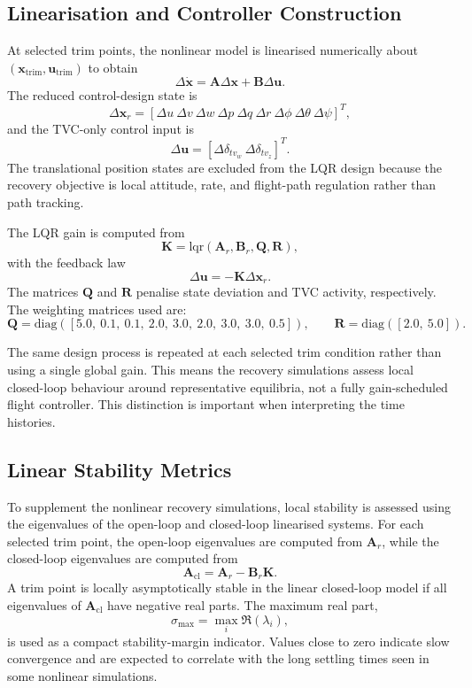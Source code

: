 \documentclass[conf]{new-aiaa}
\newcommand{\xtrim}{\mathbf{x}_{\mathrm{trim}}}
\newcommand{\utrim}{\mathbf{u}_{\mathrm{trim}}}
\newcommand{\Acl}{\mathbf{A}_{\mathrm{cl}}}
\begin{document}
\subsection{Linearisation and Controller Construction}
At selected trim points, the nonlinear model is linearised numerically about $(\xtrim,\utrim)$ to obtain
\begin{equation}
\Delta\dot{\mathbf{x}} = \mathbf{A}\Delta\mathbf{x} + \mathbf{B}\Delta\mathbf{u}.
\end{equation}
The reduced control-design state is
\[
\Delta\mathbf{x}_r = [\Delta u\ \Delta v\ \Delta w\ \Delta p\ \Delta q\ \Delta r\ \Delta\phi\ \Delta\theta\ \Delta\psi]^T,
\]
and the TVC-only control input is
\[
\Delta\mathbf{u} = [\Delta\delta_{tv_w}\ \Delta\delta_{tv_z}]^T.
\]
The translational position states are excluded from the LQR design because the recovery objective is local attitude, rate, and flight-path regulation rather than path tracking.

The LQR gain is computed from
\begin{equation}
\mathbf{K}=\mathrm{lqr}(\mathbf{A}_r,\mathbf{B}_r,\mathbf{Q},\mathbf{R}),
\end{equation}
with the feedback law
\begin{equation}
\Delta\mathbf{u}=-\mathbf{K}\Delta\mathbf{x}_r.
\end{equation}
The matrices $\mathbf{Q}$ and $\mathbf{R}$ penalise state deviation and TVC activity, respectively. The weighting matrices used are:
\begin{equation}
\mathbf{Q}=\mathrm{diag}([5.0,\ 0.1,\ 0.1,\ 2.0,\ 3.0,\ 2.0,\ 3.0,\ 3.0,\ 0.5]),\qquad
\mathbf{R}=\mathrm{diag}([2.0,\ 5.0]).
\label{eq:lqr_weights}
\end{equation}

The same design process is repeated at each selected trim condition rather than using a single global gain. This means the recovery simulations assess local closed-loop behaviour around representative equilibria, not a fully gain-scheduled flight controller. This distinction is important when interpreting the time histories.

\subsection{Linear Stability Metrics}
To supplement the nonlinear recovery simulations, local stability is assessed using the eigenvalues of the open-loop and closed-loop linearised systems. For each selected trim point, the open-loop eigenvalues are computed from $\mathbf{A}_r$, while the closed-loop eigenvalues are computed from
\begin{equation}
\Acl = \mathbf{A}_r - \mathbf{B}_r\mathbf{K}.
\end{equation}
A trim point is locally asymptotically stable in the linear closed-loop model if all eigenvalues of $\Acl$ have negative real parts. The maximum real part,
\begin{equation}
\sigma_{\max}=\max_i \Re(\lambda_i),
\end{equation}
is used as a compact stability-margin indicator. Values close to zero indicate slow convergence and are expected to correlate with the long settling times seen in some nonlinear simulations.
\end{document}
